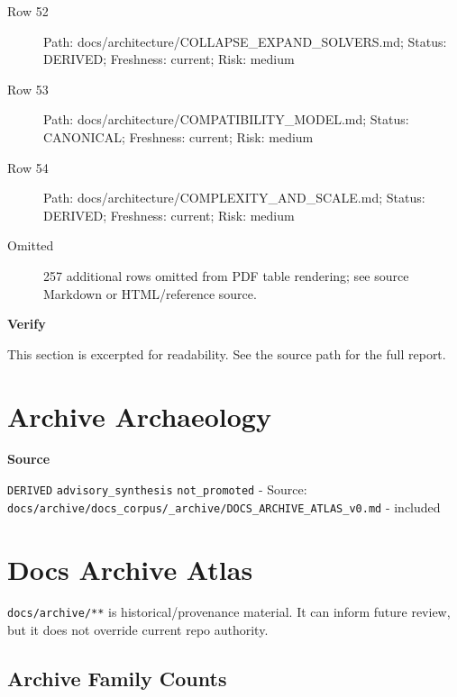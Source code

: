 \documentclass[10.5pt,a4paper,openany]{book}
\newcommand{\vonecallout}[3]{\par\medskip\noindent\begingroup\setlength{\fboxsep}{7pt}\colorbox{DomCalloutBg}{\parbox{0.94\linewidth}{\textbf{\textcolor{#1}{#2}}\par #3}}\endgroup\par\medskip}
\begin{document}
\begin{description}
\item[Row 52] Path: docs/\allowbreak{}architecture/\allowbreak{}COLLAPSE\_\allowbreak{}EXPAND\_\allowbreak{}SOLVERS.\allowbreak{}md; Status: DERIVED; Freshness: current; Risk: medium
\item[Row 53] Path: docs/\allowbreak{}architecture/\allowbreak{}COMPATIBILITY\_\allowbreak{}MODEL.\allowbreak{}md; Status: CANONICAL; Freshness: current; Risk: medium
\item[Row 54] Path: docs/\allowbreak{}architecture/\allowbreak{}COMPLEXITY\_\allowbreak{}AND\_\allowbreak{}SCALE.\allowbreak{}md; Status: DERIVED; Freshness: current; Risk: medium
\item[Omitted] 257 additional rows omitted from PDF table rendering; see source Markdown or HTML/\allowbreak{}reference source.\allowbreak{}
\end{description}

\vonecallout{DomAmber}{Verify}{This section is excerpted for readability.\allowbreak{} See the source path for the full report.\allowbreak{}}



\section{Archive Archaeology}

\vonecallout{DomSlate}{Source}{\texttt{DERIVED} \texttt{advisory\_\allowbreak{}synthesis} \texttt{not\_\allowbreak{}promoted} -\allowbreak{} Source: \texttt{docs/\allowbreak{}archive/\allowbreak{}docs\_\allowbreak{}corpus/\allowbreak{}\_\allowbreak{}archive/\allowbreak{}DOCS\_\allowbreak{}ARCHIVE\_\allowbreak{}ATLAS\_\allowbreak{}v0.\allowbreak{}md} -\allowbreak{} included}

\section{Docs Archive Atlas}

\texttt{docs/\allowbreak{}archive/\allowbreak{}**} is historical/\allowbreak{}provenance material.\allowbreak{} It can inform future review, but it does not override current repo authority.\allowbreak{}


\subsection{Archive Family Counts}
\end{document}
